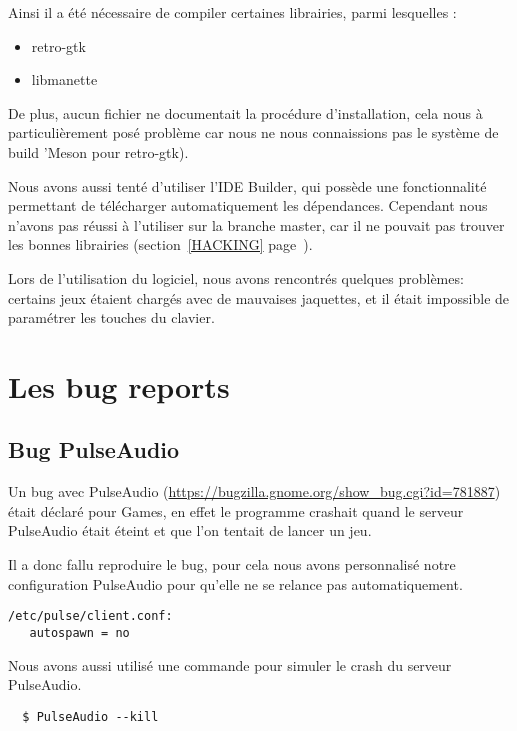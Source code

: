 \documentclass[12pt]{report}
\begin{document}
Ainsi il a été nécessaire de compiler certaines librairies, parmi
lesquelles :
\begin{itemize}
\item retro-gtk
\item libmanette\\
\end{itemize}

De plus, aucun fichier ne documentait la procédure d'installation,
cela nous à particulièrement posé problème car nous ne nous
connaissions pas le système de build 'Meson
pour retro-gtk).

Nous avons aussi tenté d'utiliser l'IDE Builder, qui possède une
fonctionnalité permettant de télécharger automatiquement les
dépendances. Cependant nous n'avons pas réussi à l'utiliser sur la branche master,
car il ne pouvait pas trouver les bonnes librairies (section~\ref{HACKING}
page~\pageref{HACKING}).

Lors de l'utilisation du logiciel, nous avons rencontrés quelques
problèmes: certains jeux étaient chargés avec de mauvaises jaquettes,
et il était impossible de paramétrer les touches du clavier.

\section{Les bug reports}
\subsection{Bug PulseAudio}
\label{PulseAudio}
Un bug avec PulseAudio (\url{https://bugzilla.gnome.org/show_bug.cgi?id=781887})
était déclaré pour Games, en effet le programme crashait quand le serveur
PulseAudio était éteint et que l'on tentait de lancer un jeu.

Il a donc fallu reproduire le bug, pour cela nous avons personnalisé notre
configuration PulseAudio pour qu'elle ne se relance pas automatiquement.
\begin{verbatim}
/etc/pulse/client.conf:
   autospawn = no
\end{verbatim}

Nous avons aussi utilisé une commande pour simuler le crash du serveur PulseAudio.
\begin{verbatim}
  $ PulseAudio --kill
\end{verbatim}
\end{document}
